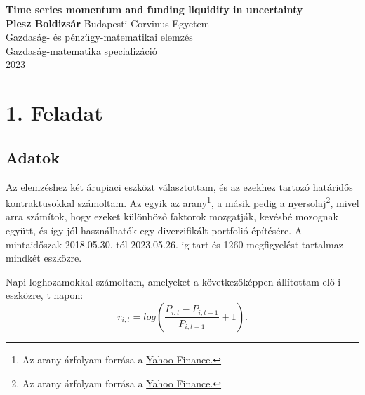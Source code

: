 \documentclass[a4paper,12pt]{article}
\begin{document}
\begin{titlepage}

   \begin{center}
       \vspace*{1cm}
        \textbf{\Large Time series momentum and funding liquidity in uncertainty} \\
       \vspace{0.5cm}
       \vspace{1.5cm}
       \textbf{Plesz Boldizsár}
       \vfill
       Budapesti Corvinus Egyetem\\
       Gazdaság- és pénzügy-matematikai elemzés\\
       Gazdaság-matematika specializáció \\
       2023 \\
	
    \end{center}
\end{titlepage}

\newpage
\tableofcontents
\newpage

\section{1. Feladat}
\subsection{Adatok}
Az elemzéshez két árupiaci eszközt választottam, és az ezekhez tartozó határidős kontraktusokkal számoltam. 
Az egyik az arany\footnote{Az arany árfolyam forrása a  
\href{https://finance.yahoo.com/quote/GC\%3DF/history?period1=1527638400&period2=1685404800&interval=1d&filter=history&frequency=1d&includeAdjustedClose=true}{Yahoo Finance.}
}, a másik pedig a nyersolaj\footnote{Az arany árfolyam forrása a  
\href{https://finance.yahoo.com/quote/CL\%3DF/history?period1=1527638400&period2=1685404800&interval=1d&filter=history&frequency=1d&includeAdjustedClose=true}{Yahoo Finance.}
}, mivel arra számítok, hogy ezeket különböző faktorok mozgatják, kevésbé mozognak együtt, és így jól használhatók egy diverzifikált portfolió építésére. 
A mintaidőszak 2018.05.30.-tól 2023.05.26.-ig tart és 1260 megfigyelést tartalmaz mindkét eszközre. 

Napi loghozamokkal számoltam, amelyeket a következőképpen állítottam elő i eszközre, t napon:
\begin{equation}
r_{i,t}=log(\frac{P_{i,t}-P_{i,t-1}}{P_{i,t-1}} + 1).
\end{equation}
\end{document}
